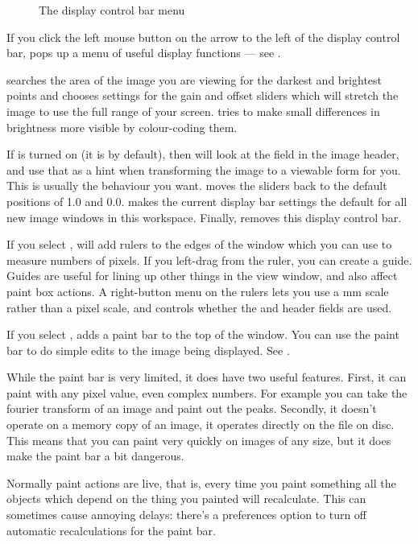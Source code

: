 \begin{figure}
\caption{The display control bar menu}
\end{figure}

If you click the left mouse button on the arrow to the left of the display 
control bar, \nip{} pops up a menu of useful display functions ---
see .

 searches the area of the image you are viewing for the darkest
and brightest points and chooses settings for the gain and offset sliders
which will stretch the image to use the full range of your screen.  tries to make small differences in brightness more visible by
colour-coding them.

If  is turned on (it is by default), then \nip{} will look
at the  field in the image header, and use that as a hint when
transforming the image to a viewable form for you. This is usually the
behaviour you want.   moves the sliders back to the default
positions of 1.0 and 0.0.  makes the current
display bar settings the default for all new image windows in this workspace.
Finally,  removes this display control
bar.

If you select , \nip{} will add rulers to the
edges of the window which you can use to measure numbers of pixels.
If you left-drag from the ruler, you can create a guide.
Guides are useful for lining up other things in the view window, and also
affect paint box actions. A right-button menu on the rulers lets you use a mm
scale rather than a pixel scale, and controls whether the  and
 header fields are used.

If you select , \nip{} adds a paint bar
to the top of the window. You can use the paint bar to do simple edits to
the image being displayed. See .

While the paint bar is very limited, it does have two useful features. First,
it can paint with any pixel value, even complex numbers. For example you can 
take the fourier transform of an image and paint out the peaks. Secondly, it 
doesn't operate on a memory copy of an image, it operates directly on the 
file on disc. This means that you can paint very quickly on images of any 
size, but it does make the paint bar a bit dangerous.

Normally paint actions are live, that is, every time you paint something all
the objects which depend on the thing you painted will recalculate. This can
sometimes cause annoying delays: there's a preferences option to turn off
automatic recalculations for the paint bar.

